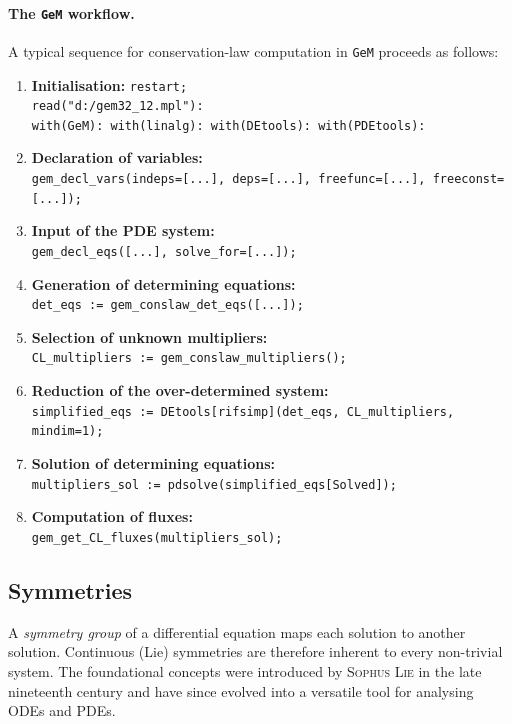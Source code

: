 \documentclass[alpha-refs, 12pt]{wiley-article}
\begin{document}
\paragraph{The \texttt{GeM} workflow.}
A typical sequence for conservation-law computation in \texttt{GeM} proceeds as follows:
\begin{enumerate}[label=(\roman*)]
  \item \textbf{Initialisation:}
        \verb|restart;|\\
        \verb|read("d:/gem32_12.mpl"):|\\
        \verb|with(GeM): with(linalg): with(DEtools): with(PDEtools):|
  \item \textbf{Declaration of variables:}\\
        \verb|gem_decl_vars(indeps=[...], deps=[...], freefunc=[...], freeconst=[...]);|
  \item \textbf{Input of the PDE system:}\\
        \verb|gem_decl_eqs([...], solve_for=[...]);|
  \item \textbf{Generation of determining equations:}\\
        \verb|det_eqs := gem_conslaw_det_eqs([...]);|
  \item \textbf{Selection of unknown multipliers:}\\
        \verb|CL_multipliers := gem_conslaw_multipliers();|
  \item \textbf{Reduction of the over-determined system:}\\
        \verb|simplified_eqs := DEtools[rifsimp](det_eqs, CL_multipliers, mindim=1);|
  \item \textbf{Solution of determining equations:}\\
        \verb|multipliers_sol := pdsolve(simplified_eqs[Solved]);|
  \item \textbf{Computation of fluxes:}\\
        \verb|gem_get_CL_fluxes(multipliers_sol);|
\end{enumerate}

\subsection{Symmetries}\label{ssec:symm}

A \emph{symmetry group} of a differential equation maps each solution to another solution. Continuous (Lie) symmetries are therefore inherent to every non-trivial system. The foundational concepts were introduced by \textsc{Sophus Lie} in the late nineteenth century and have since evolved into a versatile tool for analysing ODEs and PDEs.
\end{document}

